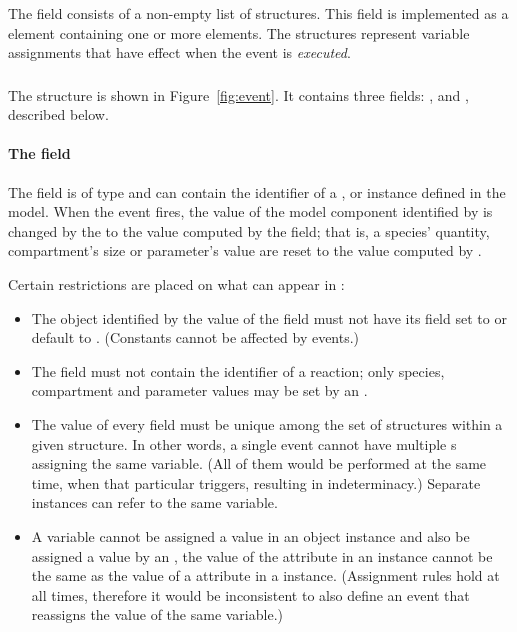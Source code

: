 The  field consists of a non-empty list of
\EventAssignment structures.  This field is implemented as a
 element containing one or more
 elements.  The \EventAssignment structures
represent variable assignments that have effect when the event is
\emph{executed}.


\subsubsection{}

The \EventAssignment structure is shown in Figure~\ref{fig:event}.
It contains three fields: ,  and
, described below.


\paragraph{The  field}

The  field is of type  and can
contain the identifier of a \Compartment, \Species or \Parameter
instance defined in the model.  When the event fires, the value of
the model component identified by  is changed by
the \EventAssignment to the value computed by the 
field; that is, a species' quantity, compartment's size or
parameter's value are reset to the value computed by .

Certain restrictions are placed on what can appear in
:
\begin{itemize}
  
\item The object identified by the value of the 
  field must not have its  field set to or default
  to .  (Constants cannot be affected by events.)
  
\item The  field must not contain the identifier
  of a reaction; only species, compartment and parameter values
  may be set by an \Event.
  
\item The value of every  field must be unique
  among the set of \EventAssignment structures within a given
  \Event structure.  In other words, a single event cannot have
  multiple \EventAssignment{}s assigning the same variable.  (All
  of them would be performed at the same time, when that
  particular \Event triggers, resulting in indeterminacy.)
  Separate \Event instances can refer to the same variable.
  
\item A variable cannot be assigned a value in an \EventAssignment
  object instance and also be assigned a value by an
  \AssignmentRule, \ie the value of the  attribute
  in an \EventAssignment instance cannot be the same as the value
  of a  attribute in a \AssignmentRule instance.
  (Assignment rules hold at all times, therefore it would be
  inconsistent to also define an event that reassigns the value of
  the same variable.)

\end{itemize}


